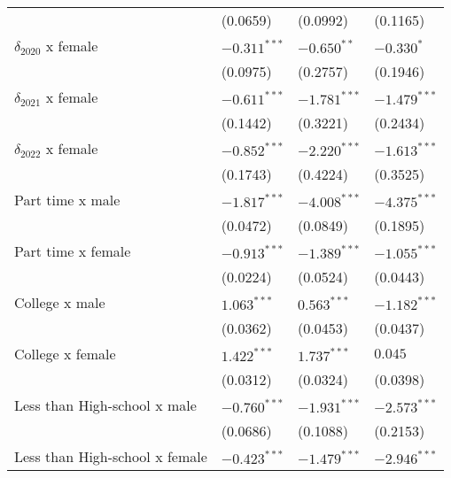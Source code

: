 \begin{tabular}{llll}
                                       &           (0.0659) &           (0.0992) &           (0.1165) \\
$\delta_{2020}$ x female               &     $-0.311^{***}$ &      $-0.650^{**}$ &         $-0.330^*$ \\
                                       &           (0.0975) &           (0.2757) &           (0.1946) \\
$\delta_{2021}$ x female               &     $-0.611^{***}$ &     $-1.781^{***}$ &     $-1.479^{***}$ \\
                                       &           (0.1442) &           (0.3221) &           (0.2434) \\
$\delta_{2022}$ x female               &     $-0.852^{***}$ &     $-2.220^{***}$ &     $-1.613^{***}$ \\
                                       &           (0.1743) &           (0.4224) &           (0.3525) \\
Part time x male                       &     $-1.817^{***}$ &     $-4.008^{***}$ &     $-4.375^{***}$ \\
                                       &           (0.0472) &           (0.0849) &           (0.1895) \\
Part time x female                     &     $-0.913^{***}$ &     $-1.389^{***}$ &     $-1.055^{***}$ \\
                                       &           (0.0224) &           (0.0524) &           (0.0443) \\
College x male                         &      $1.063^{***}$ &      $0.563^{***}$ &     $-1.182^{***}$ \\
                                       &           (0.0362) &           (0.0453) &           (0.0437) \\
College x female                       &      $1.422^{***}$ &      $1.737^{***}$ &            $0.045$ \\
                                       &           (0.0312) &           (0.0324) &           (0.0398) \\
Less than High-school x male           &     $-0.760^{***}$ &     $-1.931^{***}$ &     $-2.573^{***}$ \\
                                       &           (0.0686) &           (0.1088) &           (0.2153) \\
Less than High-school x female         &     $-0.423^{***}$ &     $-1.479^{***}$ &     $-2.946^{***}$ \\

\end{tabular}
